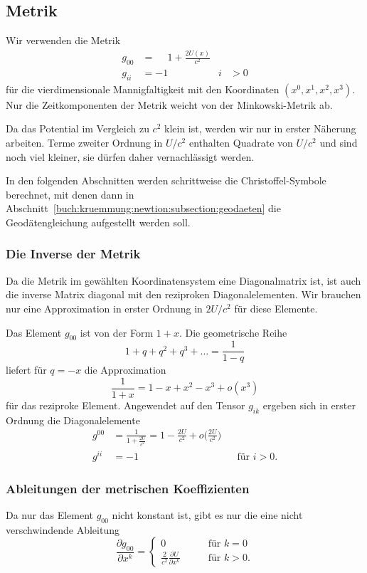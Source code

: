 %
%
\subsection{Metrik}
Wir verwenden die Metrik
\begin{equation}
\begin{aligned}
g_{00} &= \phantom{-}1 + \frac{2U(x)}{c^2} \\
g_{ii} &= -1\qquad &i&>0
\end{aligned}
\label{buch:kruemmung:newton:eqn:metrik}
\end{equation}
für die vierdimensionale Mannigfaltigkeit mit den Koordinaten
$(x^0,x^1,x^2,x^3)$.
Nur die Zeitkomponenten der Metrik weicht von der Minkowski-Metrik ab.

Da das Potential im Vergleich zu $c^2$ klein ist, werden wir nur in
erster Näherung arbeiten.
Terme zweiter Ordnung in $U/c^2$ enthalten Quadrate von $U/c^2$ und sind
noch viel kleiner, sie dürfen daher vernachlässigt werden.

In den folgenden Abschnitten werden schrittweise die Christoffel-Symbole
berechnet, mit denen dann in
Abschnitt~\ref{buch:kruemmung:newtion:subsection:geodaeten}
die Geodätengleichung aufgestellt werden soll.

%
%
\subsubsection{Die Inverse der Metrik}
Da die Metrik im gewählten Koordinatensystem eine Diagonalmatrix ist,
ist auch die inverse Matrix diagonal mit den reziproken Diagonalelementen.
Wir brauchen nur eine Approximation in erster Ordnung in $2U/c^2$
für diese Elemente.

Das Element $g_{00}$ ist von der Form $1+x$.
Die geometrische Reihe
\[
1+q+q^2+q^3+\dots = \frac{1}{1-q}
\]
liefert für $q=-x$ die Approximation
\[
\frac{1}{1+x} = 1-x+x^2-x^3+o(x^3)
\]
für das reziproke Element.
Angewendet auf den Tensor $g_{ik}$ ergeben sich in erster Ordnung
die Diagonalelemente
\begin{equation}
\begin{aligned}
g^{00}
&=
\frac{1}{\displaystyle 1+\frac{2U}{c^2}}
=
1-\frac{2U}{c^2}+o\biggl(\frac{2U}{c^2}\biggr)
\\
g^{ii}&= -1
&&\text{für $i>0$.}
\end{aligned}
\end{equation}

%
%
\subsubsection{Ableitungen der metrischen Koeffizienten}
Da nur das Element $g_{00}$ nicht konstant ist, gibt es nur die eine
nicht verschwindende Ableitung
\[
\frac{\partial g_{00}}{\partial x^k}
=
\begin{cases}
0
&\qquad\text{für $k=0$}\\[4pt]
\displaystyle
\frac{2}{c^2}
\frac{\partial U}{\partial x^k}
&\qquad\text{für $k>0$.}
\end{cases}
\]

